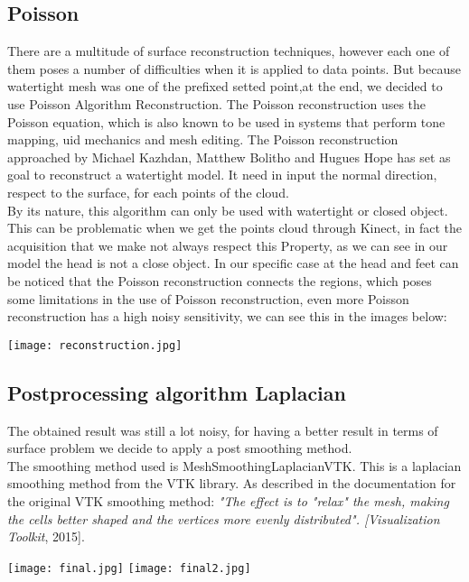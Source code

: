 \documentclass[paper=a4, fontsize=11pt]{scrartcl}	%
\numberwithin{equation}{section}															%
\numberwithin{figure}{section}																%
\numberwithin{table}{section}																%
\begin{document}
\subsection{Poisson}
There are a multitude of surface reconstruction techniques, however each one of them
poses a number of difficulties when it is applied to data points.
But because watertight mesh was one of the prefixed setted point,at the end, we decided to use Poisson Algorithm Reconstruction. 
The Poisson reconstruction uses the Poisson equation, which is also known to
be used in systems that perform tone mapping, 
uid mechanics and mesh editing. The
Poisson reconstruction approached by Michael Kazhdan, Matthew Bolitho and Hugues
Hope has set as goal to reconstruct a watertight model.
It need in input the normal direction, respect to the surface, for each points of the cloud.\\
By its nature, this algorithm can only be used with watertight or closed object. This can be problematic when we get the points cloud  through Kinect, in fact the acquisition that we make not always respect this Property, as we can see in our model the head is not a close object.
In our specific case at the head and feet  can be noticed that the Poisson reconstruction connects the regions, which poses some limitations in the use of Poisson reconstruction, even more Poisson reconstruction has a high noisy sensitivity, we can see this in the images below:\\
\begin{center}
	
	\texttt{[image: reconstruction.jpg]}\\
	
\end{center}



\subsection{Postprocessing algorithm Laplacian}
The obtained result was still a lot noisy, for having a better result in terms of surface problem we decide to apply a post smoothing method.\\
The smoothing method used is MeshSmoothingLaplacianVTK. This is a laplacian
smoothing method from the VTK library. As described in the documentation for
the original VTK smoothing method: \textit{"The effect is to "relax" the mesh, making the cells better shaped and the vertices more evenly distributed". [Visualization Toolkit}, 2015]. 
\begin{center}
	
	\texttt{[image: final.jpg]}
		\texttt{[image: final2.jpg]}
	
\end{center}
\end{document}
